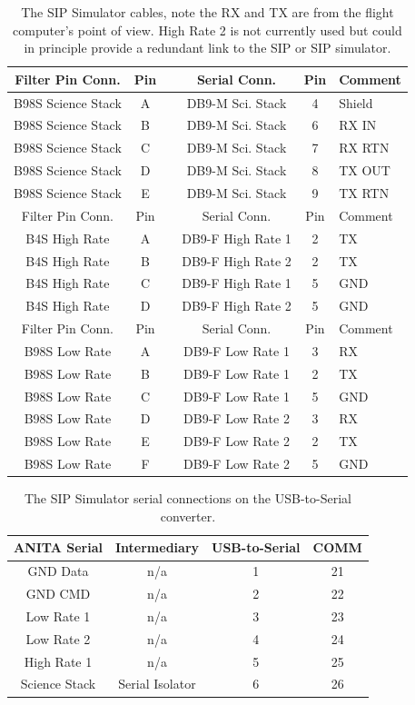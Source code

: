 \documentclass{article}
\begin{document}
\begin{table}[hbt]
  \centering
  \begin{tabular}{| c | c | b | c | c | l|}
    \hline
    \rowcolor{LightCyan}
Filter Pin Conn. & Pin &  &Serial Conn. & Pin & Comment \\
\hline
B98­S Science Stack & A & & DB9-M Sci. Stack & 4 &  Shield \\
B98­S Science Stack & B & & DB9-M Sci. Stack & 6 & RX IN \\
B98­S Science Stack & C & & DB9-M Sci. Stack & 7 & RX RTN \\
B98­S Science Stack & D & & DB9-M Sci. Stack & 8 & TX OUT \\
B98­S Science Stack & E & & DB9-M Sci. Stack & 9 & TX RTN \\
\hline
    \rowcolor{LightCyan}
Filter Pin Conn. & Pin &  & Serial Conn. & Pin & Comment \\
\hline
B4­S High Rate & A & & DB9-F High Rate 1 & 2 & TX \\
B4­S High Rate & B & & DB9-F High Rate 2 & 2 & TX \\
B4­S High Rate & C & & DB9-F High Rate 1 & 5 & GND \\
B4­S High Rate & D & & DB9-F High Rate 2 & 5 & GND \\
\hline
    \rowcolor{LightCyan}
Filter Pin Conn. & Pin &  & Serial Conn. & Pin & Comment \\
\hline
B98­S Low Rate & A & & DB9-F Low Rate 1 & 3 & RX \\
B98­S Low Rate & B & & DB9-F Low Rate 1 & 2 & TX \\
B98­S Low Rate & C & & DB9-F Low Rate 1 & 5 & GND \\
B98­S Low Rate & D & & DB9-F Low Rate 2 & 3 & RX \\
B98­S Low Rate & E & & DB9-F Low Rate 2 & 2 & TX \\
B98­S Low Rate & F & & DB9-F Low Rate 2 & 5 & GND \\
\hline
  \end{tabular}
  \caption{The SIP Simulator cables, note the RX and TX are from the flight computer's point of view. High Rate 2 is not currently used but could in principle provide a redundant link to the SIP or SIP simulator.}
  \label{tab:sipSimCables}
\end{table}

\begin{table}[hbt]
  \centering
  \begin{tabular}{| c | c | c | c |}
    \hline
    \rowcolor{LightCyan}
ANITA Serial & Intermediary & USB-to-Serial & COMM \\
\hline
GND Data & n/a  & 1 & 21 \\
GND CMD & n/a & 2 & 22 \\
Low Rate 1 & n/a  & 3 & 23 \\
Low Rate 2 & n/a & 4 & 24 \\
High Rate 1 & n/a & 5 & 25 \\
Science Stack & Serial Isolator & 6 & 26 \\ 
\hline
  \end{tabular}
  \caption{The SIP Simulator serial connections on the USB-to-Serial converter. }
  \label{tab:usbSerial}
\end{table}
\end{document}
